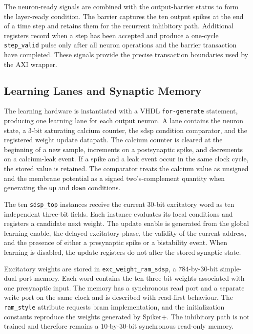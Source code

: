 The neuron-ready signals are combined with the output-barrier status to form the layer-ready condition. The barrier captures the ten output spikes at the end of a time step and retains them for the recurrent inhibitory path. Additional registers record when a step has been accepted and produce a one-cycle \texttt{step\_valid} pulse only after all neuron operations and the barrier transaction have completed. These signals provide the precise transaction boundaries used by the AXI wrapper.

\subsection{Learning Lanes and Synaptic Memory}

The learning hardware is instantiated with a VHDL \texttt{for-generate} statement, producing one learning lane for each output neuron. A lane contains the neuron state, a 3-bit saturating calcium counter, the \gls{sdsp} condition comparator, and the registered weight update datapath. The calcium counter is cleared at the beginning of a new sample, increments on a postsynaptic spike, and decrements on a calcium-leak event. If a spike and a leak event occur in the same clock cycle, the stored value is retained. The comparator treats the calcium value as unsigned and the membrane potential as a signed two's-complement quantity when generating the \texttt{up} and \texttt{down} conditions.

The ten \texttt{sdsp\_top} instances receive the current 30-bit excitatory word as ten independent three-bit fields. Each instance evaluates its local conditions and registers a candidate next weight. The update enable is generated from the global learning enable, the delayed excitatory phase, the validity of the current address, and the presence of either a presynaptic spike or a bistability event. When learning is disabled, the update registers do not alter the stored synaptic state.

Excitatory weights are stored in \texttt{exc\_weight\_ram\_sdsp}, a 784-by-30-bit simple-dual-port memory. Each word contains the ten three-bit weights associated with one presynaptic input. The memory has a synchronous read port and a separate write port on the same clock and is described with read-first behaviour. The \texttt{ram\_style} attribute requests \gls{bram} implementation, and the initialization constants reproduce the weights generated by Spiker+. The inhibitory path is not trained and therefore remains a 10-by-30-bit synchronous read-only memory.

